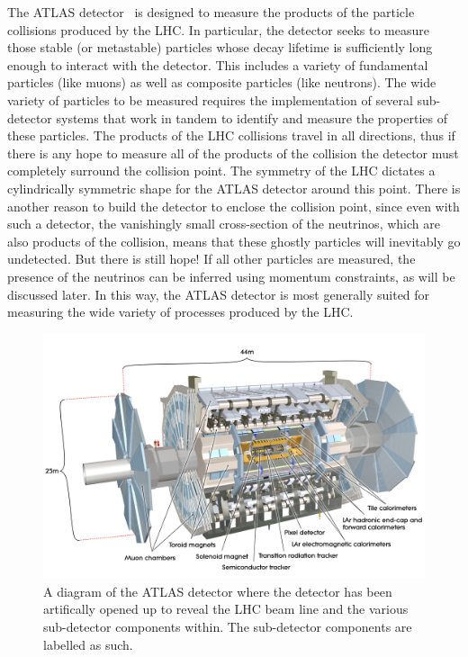 


The ATLAS detector~\cite{ATLAS} is designed to measure
the products of the particle collisions produced by the LHC.
In particular, the detector seeks to measure those stable 
(or metastable) particles whose decay lifetime is sufficiently
long enough to interact with the detector.  This includes
a variety of fundamental particles (like muons) as well as 
composite particles (like neutrons). The wide variety of 
particles to be measured requires the implementation
of several sub-detector systems that work in tandem 
to identify and measure the properties of these particles.
The products of the LHC collisions travel in all directions, 
thus if there is any hope to measure all of the products of the collision
the detector must completely surround the collision point. 
The symmetry of the LHC dictates a cylindrically symmetric
shape for the ATLAS detector around this point.
There is another reason to build the detector to enclose
the collision point, since 
even with such a detector, the vanishingly small
cross-section of the neutrinos, which are also products
of the collision, means that these ghostly particles
will inevitably go undetected. But there is still hope!
If all other particles are measured, 
the presence of the neutrinos can be inferred 
using momentum constraints, as will be discussed later.  
In this way, the ATLAS detector is most generally suited
for measuring the wide variety of processes produced
by the LHC. 

\begin{figure}[ht!]
\centering
\includegraphics[width=.9\textwidth]{figures/atlas/detector.jpg}
\caption{A diagram of the ATLAS detector where the detector has
been artifically opened up to reveal the LHC beam line and the
various sub-detector components within. The sub-detector components
are labelled as such.}
\label{fig:atlas}
\end{figure}

